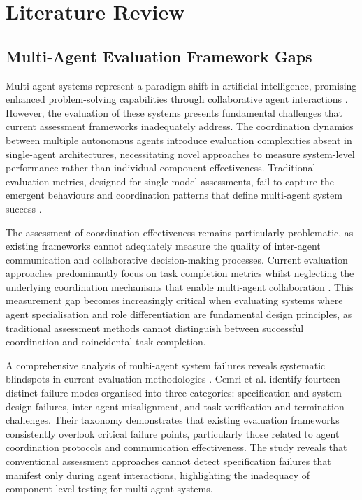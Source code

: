
\chapter{Literature Review}

\section{Multi-Agent Evaluation Framework Gaps}

Multi-agent systems represent a paradigm shift in artificial intelligence, promising enhanced problem-solving capabilities through collaborative agent interactions \cite{guo2024llm_multiagent}. However, the evaluation of these systems presents fundamental challenges that current assessment frameworks inadequately address. The coordination dynamics between multiple autonomous agents introduce evaluation complexities absent in single-agent architectures, necessitating novel approaches to measure system-level performance rather than individual component effectiveness. Traditional evaluation metrics, designed for single-model assessments, fail to capture the emergent behaviours and coordination patterns that define multi-agent system success \cite{yan2025beyond_selftalk}.

The assessment of coordination effectiveness remains particularly problematic, as existing frameworks cannot adequately measure the quality of inter-agent communication and collaborative decision-making processes. Current evaluation approaches predominantly focus on task completion metrics whilst neglecting the underlying coordination mechanisms that enable multi-agent collaboration \cite{ma2024agentboard}. This measurement gap becomes increasingly critical when evaluating systems where agent specialisation and role differentiation are fundamental design principles, as traditional assessment methods cannot distinguish between successful coordination and coincidental task completion.

A comprehensive analysis of multi-agent system failures reveals systematic blindspots in current evaluation methodologies \cite{cemri2025multiagent_failure}. Cemri et al. identify fourteen distinct failure modes organised into three categories: specification and system design failures, inter-agent misalignment, and task verification and termination challenges. Their taxonomy demonstrates that existing evaluation frameworks consistently overlook critical failure points, particularly those related to agent coordination protocols and communication effectiveness. The study reveals that conventional assessment approaches cannot detect specification failures that manifest only during agent interactions, highlighting the inadequacy of component-level testing for multi-agent systems.

